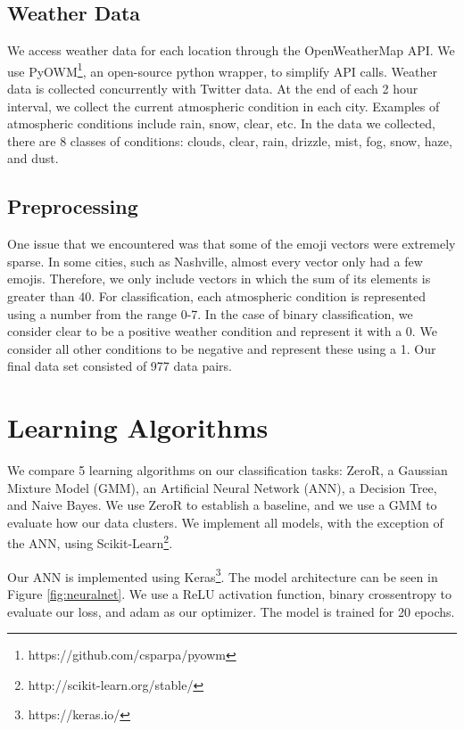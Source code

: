 \documentclass[12pt]{article}
\begin{document}
\subsection{Weather Data}
We access weather data for each location through the OpenWeatherMap API. We use PyOWM\footnote{https://github.com/csparpa/pyowm}, an open-source python wrapper, to simplify API calls. Weather data is collected concurrently with Twitter data. At the end of each 2 hour interval, we collect the current atmospheric condition in each city. Examples of atmospheric conditions include rain, snow, clear, etc. In the data we collected, there are 8 classes of conditions: clouds, clear, rain, drizzle, mist, fog, snow, haze, and dust.

\subsection{Preprocessing}
One issue that we encountered was that some of the emoji vectors were extremely sparse. In some cities, such as Nashville, almost every vector only had a few emojis. Therefore, we only include vectors in which the sum of its elements is greater than 40. For classification, each atmospheric condition is represented using a number from the range 0-7. In the case of binary classification, we consider clear to be a positive weather condition and represent it with a 0. We consider all other conditions to be negative and represent these using a 1. Our final data set consisted of 977 data pairs.

\section{Learning Algorithms}
We compare 5 learning algorithms on our classification tasks: ZeroR, a Gaussian Mixture Model (GMM), an Artificial Neural Network (ANN), a Decision Tree, and Naive Bayes. We use ZeroR to establish a baseline, and we use a GMM to evaluate how our data clusters. We implement all models, with the exception of the ANN, using Scikit-Learn\footnote{http://scikit-learn.org/stable/}.

Our ANN is implemented using Keras\footnote{https://keras.io/}. The model architecture can be seen in Figure \ref{fig:neuralnet}. We use a ReLU activation function, binary crossentropy to evaluate our loss, and adam as our optimizer\cite{Nair2010}\cite{Kingma2015}. The model is trained for 20 epochs.
\end{document}
